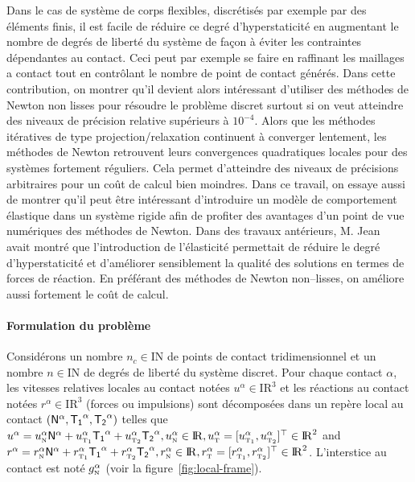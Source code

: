 \documentclass{CSMA2017}
\def\RR{\nbR}
\def\NN{\nbN}
\def\nbR{\ensuremath{\mathrm{I\!R}}} %
\def\nbN{\ensuremath{\mathrm{I\!N}}} %
\def\n{{\hbox{\tiny{N}}}}
\def\t{{\hbox{\tiny{T}}}}
\def\tone{{\hbox{\tiny{T}}}_{\hbox{\tiny{1}}}}
\def\ttwo{{\hbox{\tiny{T}}}_{\hbox{\tiny{2}}}}
\begin{document}
Dans le cas de système de corps flexibles, discrétisés par exemple par des éléments finis, il est facile de réduire ce degré d'hyperstaticité en augmentant le nombre de degrés de liberté du système de façon à éviter les contraintes dépendantes au contact. Ceci peut par exemple se faire en raffinant les maillages a contact tout en contrôlant le nombre de point de contact générés.
%
Dans cette contribution, on montrer qu'il devient alors intéressant d'utiliser des méthodes de Newton non lisses pour résoudre le problème discret surtout si on veut atteindre des niveaux de précision relative supérieurs à $10^{-4}$.  Alors que les méthodes itératives de type projection/relaxation continuent à converger lentement, les méthodes de Newton retrouvent leurs convergences quadratiques locales pour des systèmes fortement réguliers. Cela permet d'atteindre des niveaux de précisions arbitraires pour un coût de calcul bien moindres. Dans ce travail, on essaye aussi de montrer qu'il peut être intéressant d'introduire  un modèle de comportement élastique dans un système rigide afin de profiter des avantages d'un point de vue numériques des méthodes de Newton. Dans des travaux antérieurs, M. Jean~\cite{Jean1999,Acary.Jean98} avait montré que l'introduction de l'élasticité permettait de réduire le degré d'hyperstaticité et d'améliorer sensiblement la qualité des solutions en termes de forces de réaction. En préférant des méthodes de Newton non--lisses, on améliore aussi fortement le coût de calcul.


\paragraph{Formulation du problème}

Considérons un nombre  $n_c\in \NN$ de points de contact tridimensionnel et un nombre   $n\in\NN$ de degrés de liberté du système discret. Pour chaque contact $\alpha$, les vitesses relatives locales au contact notées  $u^\alpha\in\RR^3$ et les réactions au contact notées $r^\alpha\in\RR^3$ (forces ou impulsions) sont décomposées dans un repère local au contact $({\sf N}^\alpha,{\sf T_1}^\alpha,{\sf T_2}^\alpha)$ telles que  $u^\alpha = u^\alpha_{\n} {\sf N}^\alpha +   u^{\alpha}_{\tone}{\sf T_1}^\alpha + u^{\alpha}_{\ttwo}{\sf T_2}^\alpha , u^\alpha_{\n} \in \RR, u^\alpha_{\t} = [u^{\alpha}_{\tone},u^{\alpha}_{\ttwo}]^\top \in \RR^2$ and  $r^\alpha = r^\alpha_{\n} {\sf N}^\alpha +   r^{\alpha}_{\tone}{\sf T_1}^\alpha + r^{\alpha}_{\ttwo}{\sf T_2}^\alpha  , r^\alpha_{\n} \in \RR, r^\alpha_{\t}=[r^{\alpha}_{\tone},r^{\alpha}_{\ttwo}]^\top \in \RR^2$. L'interstice au contact est noté $g_\n^\alpha$ (voir la figure~\ref{fig:local-frame}).
\end{document}
